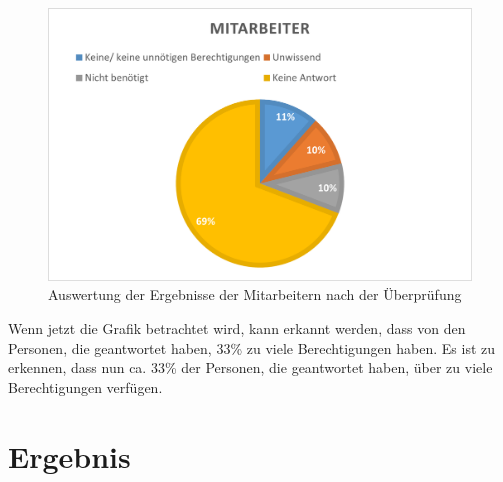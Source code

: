 \begin{figure}[h!]
 \centering
 \includegraphics[width=1\textwidth]{gfx/Picture/Mitarbeiter(korregiert).PNG}
 \caption{Auswertung der Ergebnisse der Mitarbeitern nach der Überprüfung}
 \label{fig:MitPruf}
\end{figure}
Wenn jetzt die Grafik betrachtet wird, kann erkannt werden, dass von den Personen, die geantwortet haben, 33\% zu viele Berechtigungen haben.
Es ist zu erkennen, dass nun ca. 33\% der Personen, die geantwortet haben, über zu viele Berechtigungen verfügen.
\section{Ergebnis}
\label{sec:Ergebnis}

